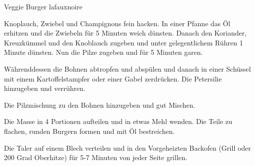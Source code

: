 \begin{recipe}[]{ Veggie Burger }{ lafauxnoire }{  }



\step
Knoplauch, Zwiebel und Champignons fein hacken. In einer Pfanne das Öl erhitzen und die Zwiebeln für 5 Minuten weich dünsten. Danach den Koriander, Kreuzkümmel und den Knoblauch zugeben und unter gelegentlichem Rühren 1 Minute dünsten. Nun die Pilze zugeben und für 5 Minuten garen.

\step
Währenddessen die Bohnen abtropfen und abspülen und danach in einer Schüssel mit einem Kartoffelstampfer oder einer Gabel zerdrücken. Die Petersilie hinzugeben und verrühren.


\step
Die Pilzmischung zu den Bohnen hinzugeben und gut Mischen. 

\step 
Die Masse in 4 Portionen aufteilen und in etwas Mehl wenden. Die Teile zu flachen, runden Burgern formen und mit Öl bestreichen.

\step 
Die Taler auf einem Blech verteilen und in den Vorgeheizten Backofen (Grill oder 200 Grad Oberhitze) für 5-7 Minuten von jeder Seite grillen.



\end{recipe}